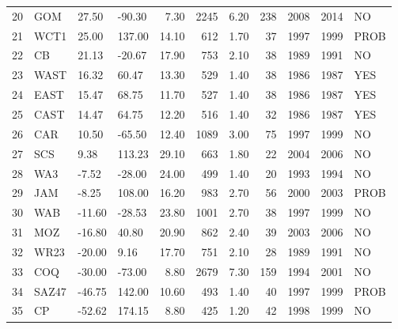 \begin{tabular}{rlllrrrrrrl}
   20 & GOM & 27.50 & -90.30 & 7.30 & 2245 & 6.20 & 238 & 2008 & 2014 & NO \\ 
   21 & WCT1 & 25.00 & 137.00 & 14.10 & 612 & 1.70 &  37 & 1997 & 1999 & PROB \\ 
   22 & CB & 21.13 & -20.67 & 17.90 & 753 & 2.10 &  38 & 1989 & 1991 & NO \\ 
   23 & WAST & 16.32 & 60.47 & 13.30 & 529 & 1.40 &  38 & 1986 & 1987 & YES \\ 
   24 & EAST & 15.47 & 68.75 & 11.70 & 527 & 1.40 &  38 & 1986 & 1987 & YES \\ 
   25 & CAST & 14.47 & 64.75 & 12.20 & 516 & 1.40 &  32 & 1986 & 1987 & YES \\ 
   26 & CAR & 10.50 & -65.50 & 12.40 & 1089 & 3.00 &  75 & 1997 & 1999 & NO \\ 
   27 & SCS & 9.38 & 113.23 & 29.10 & 663 & 1.80 &  22 & 2004 & 2006 & NO \\ 
   28 & WA3 & -7.52 & -28.00 & 24.00 & 499 & 1.40 &  20 & 1993 & 1994 & NO \\ 
   29 & JAM & -8.25 & 108.00 & 16.20 & 983 & 2.70 &  56 & 2000 & 2003 & PROB \\ 
   30 & WAB & -11.60 & -28.53 & 23.80 & 1001 & 2.70 &  38 & 1997 & 1999 & NO \\ 
   31 & MOZ & -16.80 & 40.80 & 20.90 & 862 & 2.40 &  39 & 2003 & 2006 & NO \\ 
   32 & WR23 & -20.00 & 9.16 & 17.70 & 751 & 2.10 &  28 & 1989 & 1991 & NO \\ 
   33 & COQ & -30.00 & -73.00 & 8.80 & 2679 & 7.30 & 159 & 1994 & 2001 & NO \\ 
   34 & SAZ47 & -46.75 & 142.00 & 10.60 & 493 & 1.40 &  40 & 1997 & 1999 & PROB \\ 
   35 & CP & -52.62 & 174.15 & 8.80 & 425 & 1.20 &  42 & 1998 & 1999 & NO \\ 
   \hline
\end{tabular}